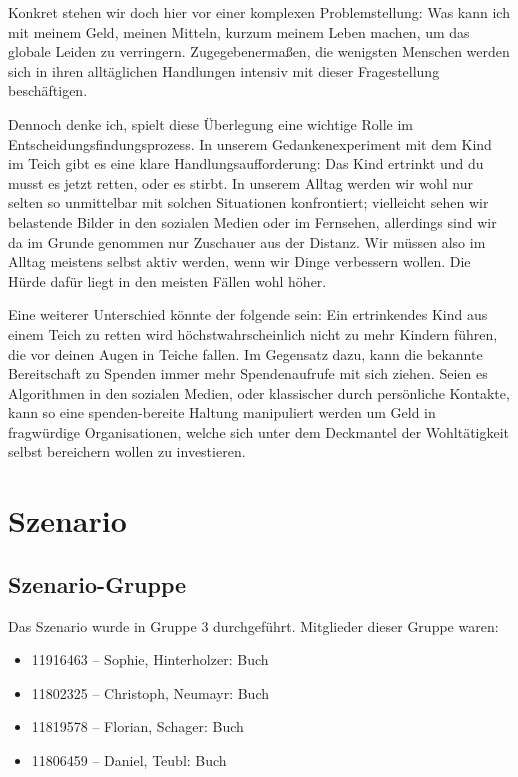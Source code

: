 \documentclass[twoside, a4paper, DIV=11, open=any, bibliography=totoc]{scrbook}
\begin{document}
Konkret stehen wir doch hier vor einer komplexen Problemstellung:
Was kann ich mit meinem Geld, meinen Mitteln, kurzum meinem Leben machen,
um das globale Leiden zu verringern.
Zugegebenermaßen, die wenigsten Menschen werden sich in ihren alltäglichen Handlungen
intensiv mit dieser Fragestellung beschäftigen.

Dennoch denke ich, spielt diese Überlegung eine wichtige Rolle im Entscheidungsfindungsprozess.
In unserem Gedankenexperiment mit dem Kind im Teich gibt es eine klare Handlungsaufforderung:
Das Kind ertrinkt und du musst es jetzt retten, oder es stirbt.
In unserem Alltag werden wir wohl nur selten so unmittelbar mit solchen Situationen konfrontiert;
vielleicht sehen wir belastende Bilder in den sozialen Medien oder im Fernsehen,
allerdings sind wir da im Grunde genommen nur Zuschauer aus der Distanz.
Wir müssen also im Alltag meistens selbst aktiv werden, wenn wir Dinge verbessern
wollen. Die Hürde dafür liegt in den meisten Fällen wohl höher.

Eine weiterer Unterschied könnte der folgende sein: Ein ertrinkendes Kind aus
einem Teich zu retten wird höchstwahrscheinlich nicht zu mehr Kindern führen,
die vor deinen Augen in Teiche fallen. Im Gegensatz dazu, kann die bekannte
Bereitschaft zu Spenden immer mehr Spendenaufrufe mit sich ziehen.
Seien es Algorithmen in den sozialen Medien, oder klassischer durch persönliche
Kontakte, kann so eine spenden-bereite Haltung manipuliert werden um Geld in
fragwürdige Organisationen, welche sich unter dem Deckmantel der Wohltätigkeit
selbst bereichern wollen zu investieren.

\chapter{Szenario} \label{chap:szenario}

\section{Szenario-Gruppe} \label{sec:szengruppe}

Das Szenario wurde in Gruppe 3 durchgeführt. Mitglieder dieser Gruppe waren:

\begin{itemize}
    \item 11916463 – Sophie, Hinterholzer: Buch
    \item 11802325 – Christoph, Neumayr: Buch
    \item 11819578 – Florian, Schager: Buch
    \item 11806459 – Daniel, Teubl: Buch
\end{itemize}
\end{document}

